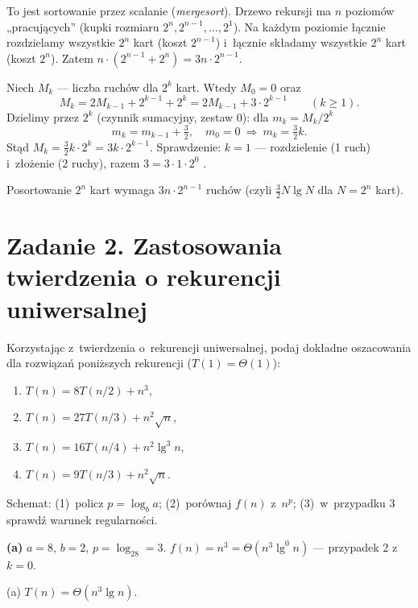 \documentclass[11pt]{article}
\begin{document}
\begin{intuicja}
To jest sortowanie przez scalanie (\emph{mergesort}). Drzewo rekursji ma $n$
poziomów „pracujących” (kupki rozmiaru $2^n,2^{n-1},\dots,2^1$). Na każdym
poziomie łącznie rozdzielamy wszystkie $2^n$ kart (koszt $2^{n-1}$) i~łącznie
składamy wszystkie $2^n$ kart (koszt $2^n$). Zatem
$n\cdot(2^{n-1}+2^n)=3n\cdot2^{n-1}$.
\end{intuicja}
\formalnie
Niech $M_k$ --- liczba ruchów dla $2^k$ kart. Wtedy $M_0=0$ oraz
\[
M_k = 2M_{k-1} + 2^{k-1} + 2^k = 2M_{k-1}+3\cdot2^{k-1}\qquad(k\ge1).
\]
Dzielimy przez $2^k$ (czynnik sumacyjny, zestaw 0): dla $m_k=M_k/2^k$
\[
m_k = m_{k-1}+\tfrac32,\quad m_0=0\ \Longrightarrow\ m_k=\tfrac32k.
\]
Stąd $M_k=\frac32k\cdot2^k=3k\cdot2^{k-1}$. Sprawdzenie: $k=1$ --- rozdzielenie
(1 ruch) i~złożenie (2 ruchy), razem $3=3\cdot1\cdot2^0$ \checkmark.
\begin{odpowiedz}
Posortowanie $2^n$ kart wymaga $3n\cdot2^{n-1}$ ruchów (czyli $\frac32N\lg N$ dla $N=2^n$ kart).
\end{odpowiedz}

\section{Zadanie 2. Zastosowania twierdzenia o rekurencji uniwersalnej}
\begin{tresc}
Korzystając z~twierdzenia o~rekurencji uniwersalnej, podaj dokładne
oszacowania dla rozwiązań poniższych rekurencji ($T(1)=\Theta(1)$):
\begin{enumerate}[label=(\alph*)]
\item $T(n)=8T(n/2)+n^3$,
\item $T(n)=27T(n/3)+n^2\sqrt n$,
\item $T(n)=16T(n/4)+n^2\lg^3n$,
\item $T(n)=9T(n/3)+n^2\sqrt n$.
\end{enumerate}
\end{tresc}

\begin{intuicja}
Schemat: (1)~policz $p=\log_ba$; (2)~porównaj $f(n)$ z~$n^p$;
(3)~w~przypadku 3 sprawdź warunek regularności.
\end{intuicja}

\textbf{(a)} $a=8$, $b=2$, $p=\log_28=3$. $f(n)=n^3=\Theta(n^3\lg^0n)$ --- przypadek 2 z~$k=0$.
\begin{odpowiedz}(a) $T(n)=\Theta(n^3\lg n)$.\end{odpowiedz}
\end{document}
